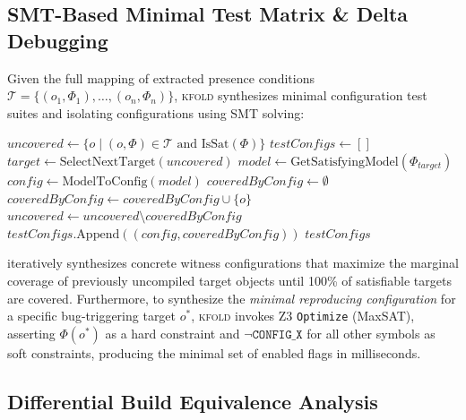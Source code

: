 \documentclass[acmsmall,screen,review]{acmart}
\newcommand{\tool}{\textsc{kfold}\xspace}
\begin{document}
\subsection{SMT-Based Minimal Test Matrix \& Delta Debugging}
\label{sec:traversal:maxsat}

Given the full mapping of extracted presence conditions $\mathcal{T} = \{ (o_1, \Phi_1), \ldots, (o_n, \Phi_n) \}$, \tool synthesizes minimal configuration test suites and isolating configurations using SMT solving:

\begin{algorithm}[t]
\caption{SMT-Based Minimal Test Suite Synthesis via Greedy Set-Cover}
\label{alg:set-cover}
\begin{algorithmic}[1]
  \State $\mathit{uncovered} \gets \{ o \mid (o, \Phi) \in \mathcal{T} \text{ and } \mathrm{IsSat}(\Phi) \}$
  \State $\mathit{testConfigs} \gets []$
    \State $\mathit{target} \gets \mathrm{SelectNextTarget}(\mathit{uncovered})$
    \State $\mathit{model} \gets \mathrm{GetSatisfyingModel}(\Phi_{\mathit{target}})$
    \State $\mathit{config} \gets \mathrm{ModelToConfig}(\mathit{model})$
    \State $\mathit{coveredByConfig} \gets \emptyset$
        \State $\mathit{coveredByConfig} \gets \mathit{coveredByConfig} \cup \{ o \}$
      \EndIf
    \EndFor
    \State $\mathit{uncovered} \gets \mathit{uncovered} \setminus \mathit{coveredByConfig}$
    \State $\mathit{testConfigs}.\mathrm{Append}((\mathit{config}, \mathit{coveredByConfig}))$
  \EndWhile
  \State \Return $\mathit{testConfigs}$
\EndFunction
\end{algorithmic}
\end{algorithm}

 iteratively synthesizes concrete witness configurations that maximize the marginal coverage of previously uncompiled target objects until 100\% of satisfiable targets are covered. Furthermore, to synthesize the \emph{minimal reproducing configuration} for a specific bug-triggering target $o^*$, \tool invokes Z3 \texttt{Optimize} (MaxSAT), asserting $\Phi(o^*)$ as a hard constraint and $\neg \texttt{CONFIG\_X}$ for all other symbols as soft constraints, producing the minimal set of enabled flags in milliseconds.

\subsection{Differential Build Equivalence Analysis}
\label{sec:traversal:diff}
\end{document}
